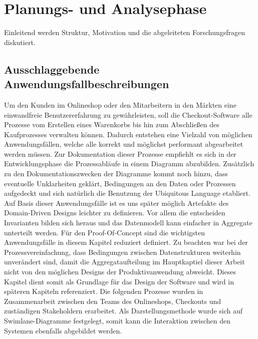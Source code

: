 

\chapter{Planungs- und Analysephase}

Einleitend werden Struktur, Motivation und die abgeleiteten Forschungsfragen diskutiert. %

\section{Ausschlaggebende Anwendungsfallbeschreibungen}


Um den Kunden im Onlineshop oder den Mitarbeitern in den Märkten eine einwandfreie Benutzererfahrung zu gewährleisten, soll die Checkout-Software alle Prozesse vom Erstellen eines Warenkorbs bis hin zum Abschließen des Kaufprozesses verwalten können. Dadurch entstehen eine Vielzahl von möglichen Anwendungsfällen, welche alle korrekt und möglichst performant abgearbeitet werden müssen. Zur Dokumentation dieser Prozesse empfiehlt es sich in der Entwicklungsphase die Prozessabläufe in einem Diagramm abzubilden. Zusätzlich zu den Dokumentationszwecken der Diagramme kommt noch hinzu, dass eventuelle Unklarheiten geklärt, Bedingungen an den Daten oder Prozessen aufgedeckt und sich natürlich die Benutzung der Ubiquitous Language etabliert. Auf Basis dieser Anwendungsfälle ist es uns später möglich Artefakte des Domain-Driven Designs leichter zu definieren. Vor allem die entscheiden Invarianten bilden sich heraus und das Datenmodell kann einfacher in Aggregate unterteilt werden. Für den Proof-Of-Concept sind die wichtigsten Anwendungsfälle in diesem Kapitel reduziert definiert. Zu beachten war bei der Prozessvereinfachung, dass Bedingungen zwischen Datenstrukturen weiterhin unverändert sind, damit die Aggregataufteilung im Hauptkaptiel dieser Arbeit nicht von den möglichen Designs der Produktivanwendung abweicht. Dieses Kapitel dient somit als Grundlage für das Design der Software und wird in späteren Kapiteln referenziert. Die folgenden Prozesse wurden in Zusammenarbeit zwischen den Teams des Onlineshops, Checkouts und zuständigen Stakeholdern erarbeitet. Als Darstellungsmethode wurde sich auf Swimlane-Diagramme festgelegt, somit kann die Interaktion zwischen den Systemen ebenfalls abgebildet werden.

